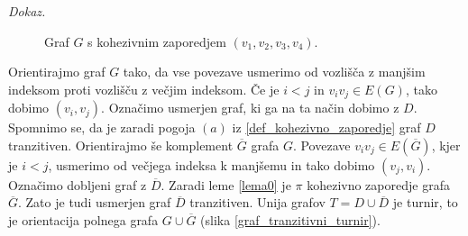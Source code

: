 \documentclass[a4paper, 12pt]{book}
\newenvironment{dokaz}{\emph{Dokaz.}\ }{\hspace{\fill}{$\Box$}}
\begin{document}
\begin{dokaz}
\begin{figure}[h]
\begin{center}
        \end{center}
        \caption{Graf $G$ s kohezivnim zaporedjem $(v_1, v_2, v_3, v_4)$.}
        \label{graf_s_kohezivnim_zaporedjem}
    \end{figure}
    Orientirajmo graf $G$ tako, da vse povezave usmerimo od vozlišča z manjšim indeksom proti vozlišču z večjim indeksom. Če je $i < j$ in $v_iv_j \in E(G)$, tako dobimo $(v_i, v_j)$. Označimo usmerjen graf, ki ga na ta način dobimo z $D$. Spomnimo se, da je zaradi pogoja $(a)$ iz \ref{def_kohezivno_zaporedje} graf $D$ tranzitiven. Orientirajmo še komplement $\overline{G}$ grafa $G$. Povezave $v_iv_j \in E(\overline{G})$, kjer je $i < j$, usmerimo od večjega indeksa k manjšemu in tako dobimo $(v_j, v_i)$. Označimo dobljeni graf z $\overline{D}$. Zaradi leme \ref{lema0} je $\pi$ kohezivno zaporedje grafa $\overline{G}$. Zato je tudi usmerjen graf $\overline{D}$ tranzitiven. Unija grafov $T = D \cup \overline{D}$ je turnir, to je orientacija polnega grafa $G \cup \overline{G}$ (slika \ref{graf_tranzitivni_turnir}).
    \begin{figure}[h]
        \begin{center}
\end{center}
\end{figure}
\end{dokaz}
\end{document}
